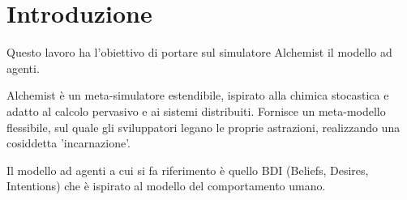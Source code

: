 \documentclass[12pt,a4paper,openright,twoside]{report}
\begin{document}
\begin{titlepage}

\thispagestyle{empty}

\topmargin=6.5cm

\raggedleft

\large

\em


\newpage

\clearpage{\pagestyle{empty}\cleardoublepage}
\end{titlepage}

\chapter*{Introduzione} %


Questo lavoro ha l'obiettivo di portare sul simulatore Alchemist il modello ad agenti.

Alchemist \`e un meta-simulatore estendibile, ispirato alla chimica stocastica e adatto al calcolo pervasivo e ai sistemi distribuiti. Fornisce un meta-modello flessibile, sul quale gli sviluppatori legano le proprie astrazioni, realizzando una cosiddetta 'incarnazione'.

Il modello ad agenti a cui si fa riferimento \`e quello BDI (Beliefs, Desires, Intentions) che \`e ispirato al modello del comportamento umano.


\clearpage{\pagestyle{empty}\cleardoublepage}

\tableofcontents

\rhead[\fancyplain{}{\bfseries\leftmark}]{\fancyplain{}{\bfseries\thepage}}
\end{document}

